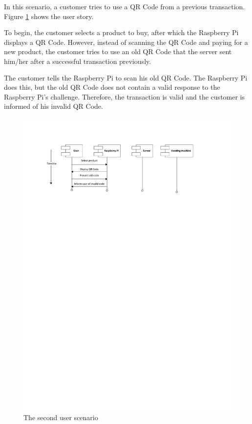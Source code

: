 In this scenario, a customer tries to use a QR Code from a previous transaction. Figure
\ref{fig:test2} shows the user story.

To begin, the customer selects a product to buy, after which the Raspberry Pi displays a
QR Code. However, instead of scanning the QR Code and paying for a new product, the
customer tries to use an old QR Code that the server sent him/her after a successful
transaction previously. 

The customer tells the Raspberry Pi to scan his old QR Code. The Raspberry Pi does
this, but the old QR Code does not contain a valid response to the Raspberry Pi's
challenge. Therefore, the transaction is valid and the customer is informed of his
invalid QR Code.

\begin{figure}
 \centering 
 \includegraphics[clip=true, trim = 0 620 0 50,
 scale=0.7]{user_story_2}
 \caption{The second user scenario}
 \label{fig:test2}
\end{figure}

